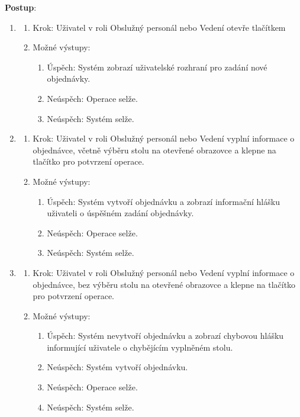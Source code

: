 \textbf{Postup}:
\begin{enumerate}
	\item 
	\begin{enumerate}
		\item Krok: Uživatel v roli Obslužný personál nebo Vedení otevře tlačítkem 
		\item Možné výstupy:
		\begin{enumerate}
			\item Úspěch: Systém zobrazí uživatelské rozhraní pro zadání nové objednávky.
			\item Neúspěch: Operace selže. 
			\item Neúspěch: Systém selže. 
		\end{enumerate} 
	\end{enumerate}

	\item 
	\begin{enumerate}
		\item Krok: Uživatel v roli Obslužný personál nebo Vedení vyplní informace o objednávce, včetně výběru stolu na otevřené obrazovce a klepne na tlačítko  pro potvrzení operace.
		\item Možné výstupy:
		\begin{enumerate}
			\item Úspěch: Systém vytvoří objednávku a zobrazí informační hlášku uživateli o úspěšném zadání objednávky.
			\item Neúspěch: Operace selže.
			\item Neúspěch: Systém selže.
		\end{enumerate} 
	\end{enumerate}

	\item 
	\begin{enumerate}
		\item Krok: Uživatel v roli Obslužný personál nebo Vedení vyplní informace o objednávce, bez výběru stolu na otevřené obrazovce a klepne na tlačítko  pro potvrzení operace.
		\item Možné výstupy:
		\begin{enumerate}
			\item Úspěch: Systém nevytvoří objednávku a zobrazí chybovou hlášku informující uživatele o chybějícím vyplněném stolu.
			\item Neúspěch: Systém vytvoří objednávku.
			\item Neúspěch: Operace selže.
			\item Neúspěch: Systém selže.
		\end{enumerate} 
	\end{enumerate}


\end{enumerate}
